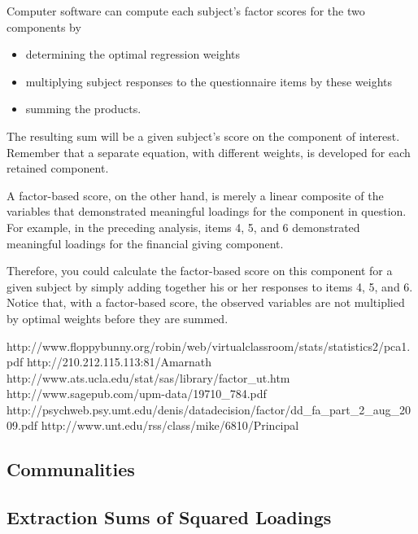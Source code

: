 Computer software can compute each subject’s factor scores for the two components
by

\begin{itemize}
\item determining the optimal regression weights
\item multiplying subject responses to the questionnaire items by these weights
\item summing the products.
\end{itemize}

The resulting sum will be a given subject’s score on the component of interest. Remember that a
separate equation, with different weights, is developed for each retained component.

A factor-based score, on the other hand, is merely a linear composite of the variables that
demonstrated meaningful loadings for the component in question. For example, in the preceding
analysis, items 4, 5, and 6 demonstrated meaningful loadings for the financial giving component.

Therefore, you could calculate the factor-based score on this component for a given subject by
simply adding together his or her responses to items 4, 5, and 6. Notice that, with a factor-based
score, the observed variables are not multiplied by optimal weights before they are summed.




http://www.floppybunny.org/robin/web/virtualclassroom/stats/statistics2/pca1.pdf
http://210.212.115.113:81/Amarnath%
http://www.ats.ucla.edu/stat/sas/library/factor_ut.htm
http://www.sagepub.com/upm-data/19710_784.pdf
http://psychweb.psy.umt.edu/denis/datadecision/factor/dd_fa_part_2_aug_2009.pdf
http://www.unt.edu/rss/class/mike/6810/Principal%
\subsection{Communalities}


\subsection{Extraction Sums of Squared Loadings}

